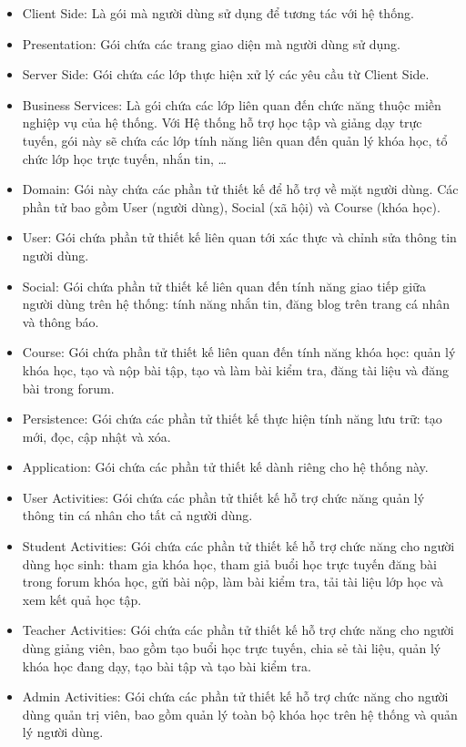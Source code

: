 \documentclass[./../main_file.tex]{subfiles}
\begin{document}
\begin{itemize}
	\item Client Side: Là gói mà người dùng sử dụng để tương tác với hệ thống.
	\item Presentation: Gói chứa các trang giao diện mà người dùng sử dụng.
	\item Server Side: Gói chứa các lớp thực hiện xử lý các yêu cầu từ Client Side.
	\item Business Services: Là gói chứa các lớp liên quan đến chức năng thuộc miền nghiệp vụ của hệ thống. Với Hệ thống hỗ trợ học tập và giảng dạy trực tuyến, gói này sẽ chứa các lớp tính năng liên quan đến quản lý khóa học, tổ chức lớp học trực tuyến, nhắn tin, …
	\item Domain: Gói này chứa các phần tử thiết kế để hỗ trợ về mặt người dùng. Các phần tử bao gồm User (người dùng), Social (xã hội) và Course (khóa học).
	\item User: Gói chứa phần tử thiết kế liên quan tới xác thực và chỉnh sửa thông tin người dùng.
	\item Social: Gói chứa phần tử thiết kế liên quan đến tính năng giao tiếp giữa người dùng trên hệ thống: tính năng nhắn tin, đăng blog trên trang cá nhân và thông báo.
	\item Course: Gói chứa phần tử thiết kế liên quan đến tính năng khóa học: quản lý khóa học, tạo và nộp bài tập, tạo và làm bài kiểm tra, đăng tài liệu và đăng bài trong forum.
	\item Persistence: Gói chứa các phần tử thiết kế thực hiện tính năng lưu trữ: tạo mới, đọc, cập nhật và xóa.
	\item Application: Gói chứa các phần tử thiết kế dành riêng cho hệ thống này.
	\item User Activities: Gói chứa các phần tử thiết kế hỗ trợ chức năng quản lý thông tin cá nhân cho tất cả người dùng.
	\item Student Activities: Gói chứa các phần tử thiết kế hỗ trợ chức năng cho người dùng học sinh: tham gia khóa học, tham giả buổi học trực tuyến đăng bài trong forum khóa học, gửi bài nộp, làm bài kiểm tra, tải tài liệu lớp học và xem kết quả học tập.
	\item Teacher Activities: Gói chứa các phần tử thiết kế hỗ trợ chức năng cho người dùng giảng viên, bao gồm tạo buổi học trực tuyến, chia sẻ tài liệu, quản lý khóa học đang dạy, tạo bài tập và tạo bài kiểm tra.
	\item Admin Activities: Gói chứa các phần tử thiết kế hỗ trợ chức năng cho người dùng quản trị viên, bao gồm quản lý toàn bộ khóa học trên hệ thống và quản lý người dùng.
\end{itemize}
\end{document}
